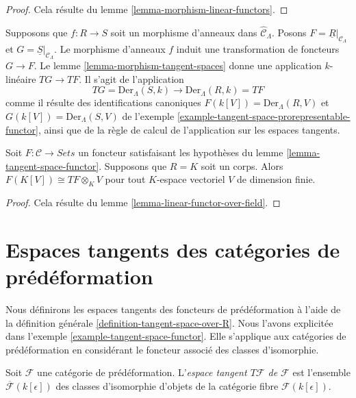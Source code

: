 \begin{proof}
Cela résulte du lemme \ref{lemma-morphism-linear-functors}.
\end{proof}

\begin{example}
\label{example-tangent-space-map-prorepresentable-functor}
Supposons que $f : R \to S$ soit un morphisme d'anneaux dans
$\widehat{\mathcal{C}}_\Lambda$. Posons
$F = \underline{R}|_{\mathcal{C}_\Lambda}$ et
$G = \underline{S}|_{\mathcal{C}_\Lambda}$. Le morphisme d'anneaux $f$ induit
une transformation de foncteurs $G \to F$. Le lemme
\ref{lemma-morphism-tangent-spaces} donne une application $k$-linéaire
$TG \to TF$. Il s'agit de l'application
$$
TG = \text{Der}_\Lambda(S, k) \longrightarrow \text{Der}_\Lambda(R, k) = TF
$$
comme il résulte des identifications canoniques
$F(k[V]) = \text{Der}_\Lambda(R, V)$ et
$G(k[V]) = \text{Der}_\Lambda(S, V)$ de l'exemple
\ref{example-tangent-space-prorepresentable-functor}, ainsi que de la règle de
calcul de l'application sur les espaces tangents.
\end{example}

\begin{lemma}
\label{lemma-tangent-space-tensor}
Soit $F: \mathcal{C} \to \textit{Sets}$ un foncteur satisfaisant les
hypothèses du lemme \ref{lemma-tangent-space-functor}. Supposons que $R = K$
soit un corps. Alors $F(K[V]) \cong TF \otimes_K V$ pour tout $K$-espace
vectoriel $V$ de dimension finie.
\end{lemma}

\begin{proof}
Cela résulte du lemme \ref{lemma-linear-functor-over-field}.
\end{proof}






\section{Espaces tangents des catégories de prédéformation}
\label{section-tangent-spaces}

\noindent
Nous définirons les espaces tangents des foncteurs de prédéformation à l'aide
de la définition générale \ref{definition-tangent-space-over-R}. Nous l'avons
explicitée dans l'exemple \ref{example-tangent-space-functor}. Elle s'applique
aux catégories de prédéformation en considérant le foncteur associé des
classes d'isomorphie.

\begin{definition}
\label{definition-tangent-space}
Soit $\mathcal{F}$ une catégorie de prédéformation. L'{\it espace tangent
$T \mathcal{F}$ de $\mathcal{F}$} est l'ensemble
$\overline{\mathcal{F}}(k[\epsilon])$ des classes d'isomorphie d'objets de la
catégorie fibre $\mathcal
F(k[\epsilon])$.
\end{definition}

